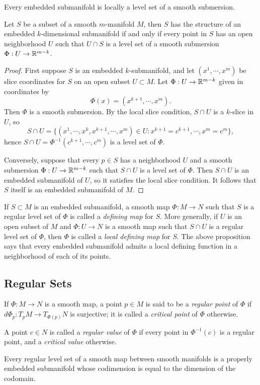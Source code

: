 Every embedded submanifold is locally a level set of a smooth submersion. 
\begin{proposition}\label{5.16}
    Let $S$ be a subset of a smooth $m$-manifold $M$, then $S$ has the structure of an embedded $k$-dimensional submanifold if and only if every point in $S$ has an open neighborhood $U$ such that $U \cap S$ is a level set of a smooth submersion $\Phi:U \to \mathbb{R}^{m-k}$.
\end{proposition}
\begin{proof}
    First suppose $S$ is an embedded $k$-submanifold, and let $(x^1, \cdots, x^m)$ be slice coordinates for $S$ on an open subset $U \subset M$. Let $\Phi:U \to \mathbb{R}^{m-k}$ given in coordinates by 
    $$\Phi(x) = (x^{k+1}, \cdots, x^m). $$
    Then $\Phi$ is a smooth submersion. By the local slice condition, $S \cap U$ is a $k$-slice in $U$, so 
    $$S \cap U = \{(x^1,\cdots,x^k,x^{k+1},\cdots,x^m)\in U: x^{k+1}=c^{k+1},\cdots,x^m=c^m\},$$
    hence $S \cap U = \Phi^{-1}(c^{k+1}, \cdots, c^m)$ is a level set of $\Phi$. 

    Conversely, suppose that every $p \in S$ has a neighborhood $U$ and a smooth submersion $\Phi:U \to \mathbb{R}^{m-k}$ such that $S \cap U$ is a level set of $\Phi$. Then $S \cap U$ is an embedded submanifold of $U$, so it satisfies the local slice condition. It follows that $S$ itself is an embedded submanifold of $M$. 
\end{proof}
If $S \subset M$ is an embedded submanifold, a smooth map $\Phi:M \to N$ such that $S$ is a regular level set of $\Phi$ is called a \textit{defining map} for $S$. More generally, if $U$ is an open subset of $M$ and $\Phi:U \to N$ is a smooth map such that $S \cap U$ is a regular level set of $\Phi$, then $\Phi$ is called a \textit{local defining map} for $S$. The above proposition says that every embedded submanifold admits a local defining function in a neighborhood of each of its points. 
 
\subsection*{Regular Sets}
If $\Phi:M \to N$ is a smooth map, a point $p \in M$ is said to be a \textit{regular point} of $\Phi$ if $d\Phi_p:T_pM \to T_{\Phi(p)}N$ is surjective; it is called a \textit{critical point} of $\Phi$ otherwise. 

A point $c \in N$ is called a \textit{regular value} of $\Phi$ if every point in $\Phi^{-1}(c)$ is a regular point, and a \textit{critical value} otherwise. 
\begin{theorem}
    Every regular level set of a smooth map between smooth manifolds is a properly embedded submanifold whose codimension is equal to the dimension of the codomain. 
\end{theorem}
